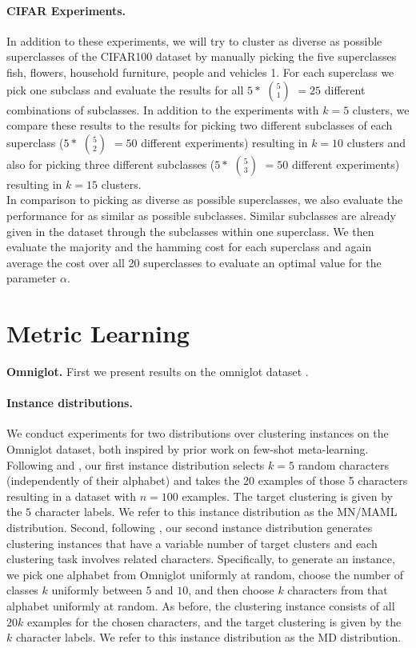 \paragraph{CIFAR Experiments.} In addition to these experiments, we will try to cluster as diverse as possible superclasses of the CIFAR100 dataset by manually picking the five superclasses fish, flowers, household furniture, people and vehicles 1. For each superclass we pick one subclass and evaluate the results for all $5 *$ $5 \choose 1$ $= 25$ different combinations of subclasses. In addition to the experiments with $k = 5$ clusters, we compare these results to the results for picking two different subclasses of each superclass ($5 *$ $5 \choose 2$ $= 50$ different experiments) resulting in $k = 10$ clusters and also for picking three different subclasses ($5 *$ $5 \choose 3$ $= 50$ different experiments) resulting in $k = 15$ clusters.\\

In comparison to picking as diverse as possible superclasses, we also evaluate the performance for as similar as possible subclasses. Similar subclasses are already given in the dataset through the subclasses within one superclass. We then evaluate the majority and the hamming cost for each superclass and again average the cost over all 20 superclasses to evaluate an optimal value for the parameter $\alpha$.

\section{Metric Learning}

\medskip\noindent\textbf{Omniglot.} First we present results on the omniglot
dataset \cite{Lake1332}.

\paragraph{Instance distributions.} We conduct experiments for two distributions
over clustering instances on the Omniglot dataset, both inspired by prior work
on few-shot meta-learning. Following \cite{NIPS2016_6385} and
\cite{pmlr-v70-finn17a}, our first instance distribution selects $k = 5$ random
characters (independently of their alphabet) and takes the 20 examples of those
5 characters resulting in a dataset with $n = 100$ examples. The target
clustering is given by the $5$ character labels. We refer to this instance
distribution as the MN/MAML distribution. Second, following
\cite{DBLP:journals/corr/abs-1903-03096}, our second instance distribution generates
clustering instances that have a variable number of target clusters and each
clustering task involves related characters. Specifically, to generate an
instance, we pick one alphabet from Omniglot uniformly at random, choose the
number of classes $k$ uniformly between $5$ and $10$, and then choose $k$
characters from that alphabet uniformly at random. As before, the clustering
instance consists of all $20k$ examples for the chosen characters, and the
target clustering is given by the $k$ character labels. We refer to this
instance distribution as the MD distribution.

